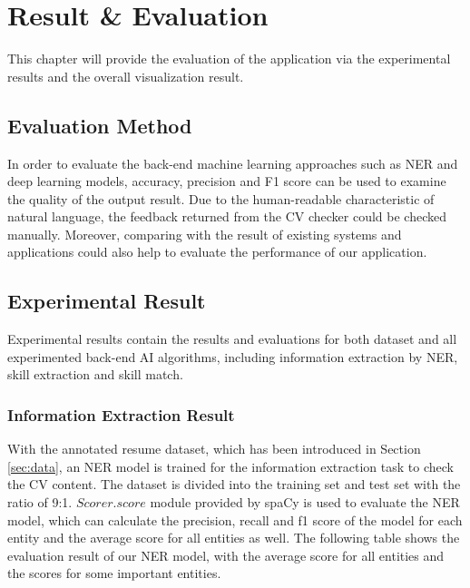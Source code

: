 \chapter{Result \& Evaluation}
\label{ch:evaluation}

This chapter will provide the evaluation of the application via the experimental results and the overall visualization result. 

\section{Evaluation Method}

In order to evaluate the back-end machine learning approaches such as NER and deep learning models, accuracy, precision and F1 score can be used to examine the quality of the output result. Due to the human-readable characteristic of natural language, the feedback returned from the CV checker could be checked manually. Moreover, comparing with the result of existing systems and applications could also help to evaluate the performance of our application.


\section{Experimental Result}
Experimental results contain the results and evaluations for both dataset and all experimented back-end AI algorithms, including information extraction by NER, skill extraction and skill match.

\subsection{Information Extraction Result}
\label{sec:ner_result}

With the annotated resume dataset, which has been introduced in Section \ref{sec:data}, an NER model is trained for the information extraction task to check the CV content. The dataset is divided into the training set and test set with the ratio of 9:1. $Scorer.score$ module provided by spaCy is used to evaluate the NER model, which can calculate the precision, recall and f1 score of the model for each entity and the average score for all entities as well. The following table shows the evaluation result of our NER model, with the average score for all entities and the scores for some important entities. 


